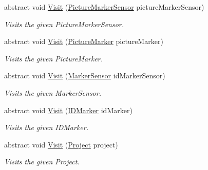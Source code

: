 \begin{DoxyCompactItemize}
abstract void \hyperlink{class_a_rdev_kit_1_1_controller_1_1_project_controller_1_1_abstract_project_visitor_a2f87bcb8c5df6e3aeb5fca33d43e5fd8}{Visit} (\hyperlink{class_a_rdev_kit_1_1_model_1_1_project_1_1_picture_marker_sensor}{Picture\-Marker\-Sensor} picture\-Marker\-Sensor)
\begin{DoxyCompactList}\small\item\em Visits the given Picture\-Marker\-Sensor. \end{DoxyCompactList}\item 
abstract void \hyperlink{class_a_rdev_kit_1_1_controller_1_1_project_controller_1_1_abstract_project_visitor_a07ea2f0ff782d6d5c3c122575c2acc51}{Visit} (\hyperlink{class_a_rdev_kit_1_1_model_1_1_project_1_1_picture_marker}{Picture\-Marker} picture\-Marker)
\begin{DoxyCompactList}\small\item\em Visits the given Picture\-Marker. \end{DoxyCompactList}\item 
abstract void \hyperlink{class_a_rdev_kit_1_1_controller_1_1_project_controller_1_1_abstract_project_visitor_afce8054c78342330b871b0acc0bcdfad}{Visit} (\hyperlink{class_a_rdev_kit_1_1_model_1_1_project_1_1_marker_sensor}{Marker\-Sensor} id\-Marker\-Sensor)
\begin{DoxyCompactList}\small\item\em Visits the given Marker\-Sensor. \end{DoxyCompactList}\item 
abstract void \hyperlink{class_a_rdev_kit_1_1_controller_1_1_project_controller_1_1_abstract_project_visitor_a8f6463762a4fee7bab0e1bad63836abf}{Visit} (\hyperlink{class_a_rdev_kit_1_1_model_1_1_project_1_1_i_d_marker}{I\-D\-Marker} id\-Marker)
\begin{DoxyCompactList}\small\item\em Visits the given I\-D\-Marker. \end{DoxyCompactList}\item 
abstract void \hyperlink{class_a_rdev_kit_1_1_controller_1_1_project_controller_1_1_abstract_project_visitor_a6f3a8879b50f53e1d25fc87c588a59fa}{Visit} (\hyperlink{class_a_rdev_kit_1_1_model_1_1_project_1_1_project}{Project} project)
\begin{DoxyCompactList}\small\item\em Visits the given Project. \end{DoxyCompactList}\end{DoxyCompactItemize}



